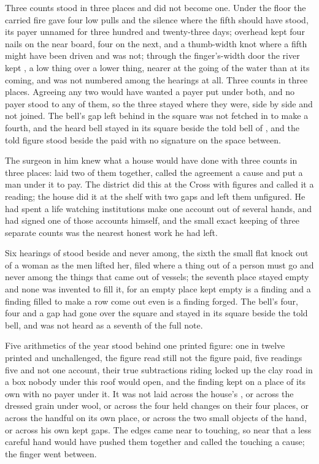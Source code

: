 \scenebreak

Three counts stood in three places and did not become one. Under the floor the carried fire gave four low pulls and the silence where the fifth should have stood, its payer unnamed for three hundred and twenty-three days; overhead  kept four nails on the near board, four on the next, and a thumb-width knot where a fifth might have been driven and was not; through the finger's-width door the river kept , a low thing over a lower thing, nearer at the going of the water than at its coming, and was not numbered among the hearings at all. Three counts in three places. Agreeing any two would have wanted a payer put under both, and no payer stood to any of them, so the three stayed where they were, side by side and not joined. The bell's gap left behind in the square was not fetched in to make a fourth, and the heard bell stayed in its square beside the told bell of , and the told figure stood beside the paid with no signature on the space between.

The surgeon in him knew what a house would have done with three counts in three places: laid two of them together, called the agreement a cause and put a man under it to pay. The district did this at the Cross with figures and called it a reading; the house did it at the shelf with two gaps and left them unfigured. He had spent a life watching institutions make one account out of several hands, and had signed one of those accounts himself, and the small exact keeping of three separate counts was the nearest honest work he had left.

Six hearings of  stood beside and never among, the sixth the small flat knock out of a woman as the men lifted her, filed where a thing out of a person must go and never among the things that came out of vessels; the seventh place stayed empty and none was invented to fill it, for an empty place kept empty is a finding and a finding filled to make a row come out even is a finding forged. The bell's four, four and a gap had gone over the square and stayed in its square beside the told bell, and was not heard as a seventh of the full note.

Five arithmetics of the year stood behind one printed figure: one in twelve printed and unchallenged, the figure read still not the figure paid, five readings five and not one account, their true subtractions riding locked up the clay road in a box nobody under this roof would open, and the finding kept on a place of its own with no payer under it. It was not laid across the house's , or across the dressed grain under wool, or across the four held changes on their four places, or across the handful on its own place, or across the two small objects of the hand, or across his own kept gaps. The edges came near to touching, so near that a less careful hand would have pushed them together and called the touching a cause; the finger went between.

